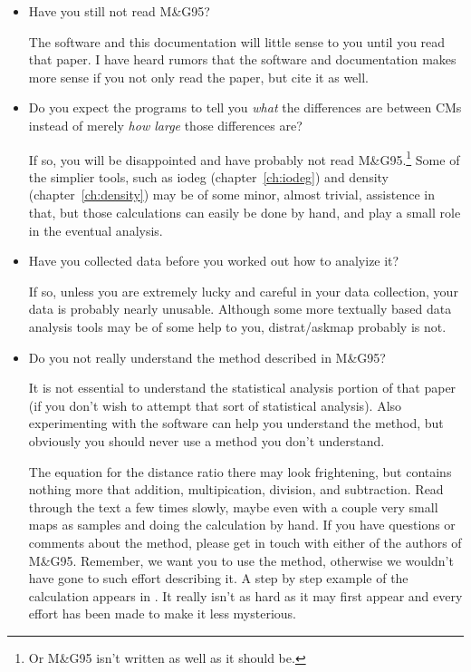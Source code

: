 \documentclass[%
	11pt,
        a4paper,
        twoside]{workrep}
\newcommand*{\prg}[1]{\textsf{#1}}		%
\newcommand{\dram}{\prg{distrat}/\prg{askmap}\xspace}	%
\newcommand{\MG}{M\&G95\xspace}			%
\begin{document}
\begin{itemize}
\item Have you still not read \MG?

   The software and this documentation will little sense to you until
   you read that paper.  I have heard rumors that the software and
   documentation makes more sense if you not only read the paper, but
   cite it as well.

\item Do you expect the programs to tell you \emph{what} the
   differences are between CMs instead of merely \emph{how large}
   those differences are?

   If so, you will be disappointed and
   have probably not read \MG.\footnote{Or \MG isn't written as
    well as it should be.}
   Some of the simplier tools,
   such as \prg{iodeg} (chapter~\ref{ch:iodeg})
   and \prg{density} (chapter~\ref{ch:density})
   may be of some minor, almost trivial,
   assistence in that, but those calculations can easily be
   done by hand, and play a small role in the eventual analysis.

\item
  Have you collected data before you worked out how to analyize it?

  If so, unless you are extremely lucky and careful in your data
  collection, your data is probably nearly unusable.  Although
  some more textually based data analysis tools may be of some
  help to you, \dram probably is not.

\item
  Do you not really understand the method described in \MG?

  It is not essential to understand the statistical analysis portion
  of that paper (if you don't wish to attempt that sort of statistical
  analysis).  Also experimenting with the software can help
  you understand the method, but obviously you should never use
  a method you don't understand.

  The equation for the distance ratio there may look frightening,
  but contains nothing more that addition, multipication, division,
  and subtraction.
  Read through the text a few times slowly, maybe even with a couple
  very small maps as samples and doing the calculation by hand.  If you
  have questions or comments about the method, please get in touch
  with either of the authors of \MG.  Remember, we want you to use the
  method, otherwise we wouldn't have gone to such effort describing it.
  A step by step example of the calculation appears
  in .
  It really isn't as hard as it may first appear and every effort
  has been made to make it less mysterious.


\end{itemize}
\end{document}
